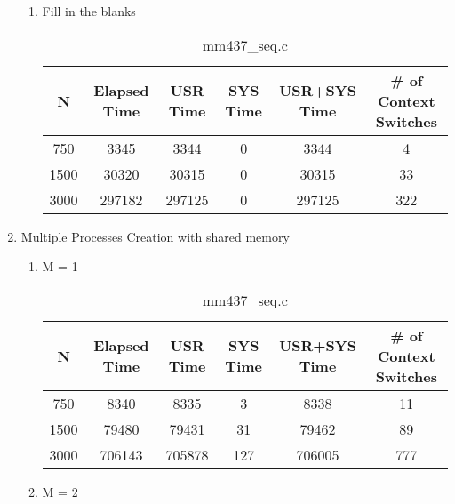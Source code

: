 \documentclass{article}
\begin{document}
\begin{enumerate}
\begin{enumerate}
	\item Fill in the blanks \\
		\begin{table}[ht]
		\caption{mm437\_seq.c} %
		\centering %
		\begin{tabular}{c c c c c c} %
		\hline\hline %
		N & Elapsed Time & USR Time & SYS Time & USR+SYS Time & \# of Context Switches\\ [0.5ex] %
		\hline %
		750 & 3345 & 3344 & 0 & 3344 & 4 & \\
		1500 & 30320 & 30315 & 0 & 30315 & 33 & \\
		3000 & 297182 & 297125 & 0 & 297125 & 322 & \\ [1ex] %
		\hline %
		\end{tabular}
		\label{table:nonlin} %
		\end{table}
	\end{enumerate}
	\item Multiple Processes Creation with shared memory \\
		\begin{enumerate}
			\item M = 1 \\
				\begin{table}[ht]
				\caption{mm437\_seq.c} %
				\centering %
				\begin{tabular}{c c c c c c} %
				\hline\hline %
				N & Elapsed Time & USR Time & SYS Time & USR+SYS Time & \# of Context Switches\\ [0.5ex] %
				\hline %
				750 & 8340 & 8335 & 3 & 8338 & 11 & \\
				1500 & 79480 & 79431 & 31 & 79462 & 89 & \\
				3000 & 706143 & 705878 & 127 & 706005 & 777 & \\ [1ex] %
				\hline %
				\end{tabular}
				\label{table:nonlin} %
				\end{table}
		\item M = 2 \\
				\begin{table}[ht]

\end{table}
\end{enumerate}
\end{enumerate}
\end{document}
